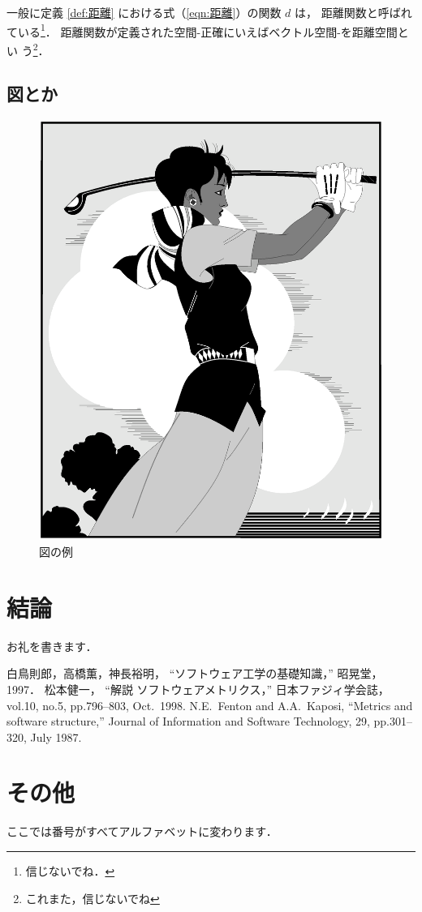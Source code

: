 \documentclass{thesis}
\begin{document}
一般に定義 \ref{def:距離} における式（\ref{eqn:距離}）の関数 $d$ は，
距離関数と呼ばれている\footnote{信じないでね．}．
距離関数が定義された空間{\--}正確にいえばベクトル空間{\--}を距離空間とい
う\footnote{これまた，信じないでね}．

\section{図とか}

\begin{figure}[H]
 \center
 \includegraphics[scale=0.3]{./golfer.eps}
 \caption{図の例}
\end{figure}

\chapter{結論}

\acknowledgement

お礼を書きます．

\begin{thebibliography}{99}
白鳥則郎，高橋薫，神長裕明，
``ソフトウェア工学の基礎知識，''
昭晃堂，1997．
%
松本健一，
``解説 ソフトウェアメトリクス，'' 
日本ファジィ学会誌，vol.10, no.5, pp.796--803, Oct.\ 1998.
%
N.E.\ Fenton and A.A.\ Kaposi, 
``Metrics and software structure,''
Journal of Information and Software Technology,
29, pp.301--320, July 1987.
\end{thebibliography}

\appendix

\chapter{その他}

ここでは番号がすべてアルファベットに変わります．
\end{document}
